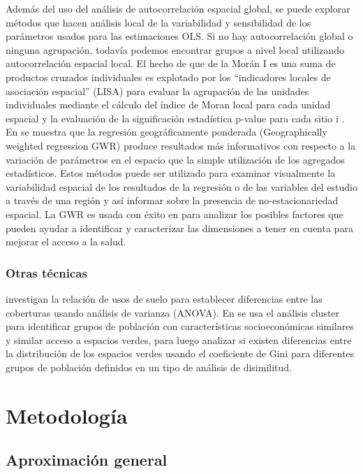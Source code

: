 \documentclass[12pt,]{book}
\begin{document}
Además del uso del análisis de autocorrelación espacial global, se puede
explorar métodos que hacen análisis local de la variabilidad y
sensibilidad de los parámetros usados para las estimaciones OLS. Si no
hay autocorrelación global o ninguna agrupación, todavía podemos
encontrar grupos a nivel local utilizando autocorrelación espacial
local. El hecho de que de la Morán I es una suma de productos cruzados
individuales es explotado por los ``indicadores locales de asociación
espacial'' (LISA) para evaluar la agrupación de las unidades
individuales mediante el cálculo del índice de Moran local para cada
unidad espacial y la evaluación de la significación estadística p-value
para cada sitio i \citep{talen_assessing_1998}. En
\citet{fotheringham_geographically_1998} se muestra que la regresión
geográficamente ponderada (Geographically weighted regression GWR)
produce resultados más informativos con respecto a la variación de
parámetros en el espacio que la simple utilización de los agregados
estadísticos. Estos métodos puede ser utilizado para examinar
visualmente la variabilidad espacial de los resultados de la regresión o
de las variables del estudio a través de una región y así informar sobre
la presencia de no-estacionariedad espacial. La GWR es usada con éxito
en \citep{comber_spatial_2011} para analizar los posibles factores que
pueden ayudar a identificar y caracterizar las dimensiones a tener en
cuenta para mejorar el acceso a la salud.

\subsection{Otras técnicas}\label{otras-tecnicas}

\citep{nesbitt_exploring_2016} investigan la relación de usos de suelo
para establecer diferencias entre las coberturas usando análisis de
varianza (ANOVA). En \citep{kabisch_green_2014} se usa el análisis
cluster para identificar grupos de población con características
socioeconómicas similares y similar acceso a espacios verdes, para luego
analizar si existen diferencias entre la distribución de los espacios
verdes usando el coeficiente de Gini para diferentes grupos de población
definidos en un tipo de análisis de disimilitud.

\chapter{Metodología}\label{meto}

\section{Aproximación general}\label{aproximacion-general}
\end{document}

